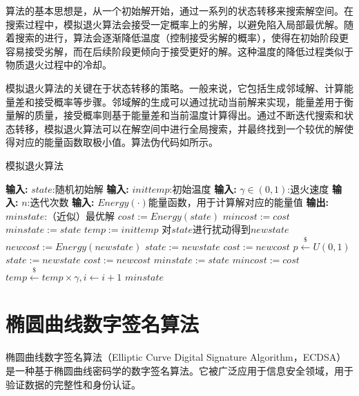 {	算法的基本思想是，从一个初始解开始，通过一系列的状态转移来搜索解空间。在搜索过程中，模拟退火算法会接受一定概率上的劣解，以避免陷入局部最优解。随着搜索的进行，算法会逐渐降低温度（控制接受劣解的概率），使得在初始阶段更容易接受劣解，而在后续阶段更倾向于接受更好的解\citep{Steinbrunn1997}。这种温度的降低过程类似于物质退火过程中的冷却。
	
	模拟退火算法的关键在于状态转移的策略。一般来说，它包括生成邻域解、计算能量差和接受概率等步骤。邻域解的生成可以通过扰动当前解来实现，能量差用于衡量解的质量，接受概率则基于能量差和当前温度计算得出。通过不断迭代搜索和状态转移，模拟退火算法可以在解空间中进行全局搜索，并最终找到一个较优的解使得对应的能量函数取极小值。算法伪代码如所示。
	
	\begin{breakablealgorithm}%
		\caption{模拟退火算法}\label{alg:sa}
		\begin{algorithmic}[1]
			\Statex \textbf{输入:} $state$:随机初始解
			\Statex \textbf{输入:} $inittemp$:初始温度
			\Statex \textbf{输入:} $\gamma\in(0,1)$:退火速度
			\Statex \textbf{输入:} $n$:迭代次数
			\Statex \textbf{输入:} $Energy(\cdot)$能量函数，用于计算解对应的能量值
			\Statex \textbf{输出:} $minstate$:（近似）最优解
			\State $cost := Energy(state)$
			\State $mincost:=cost$
			\State $minstate:=state$
			\State $temp:=inittemp$
				\Repeat
					\State 对$state$进行扰动得到$newstate$
					\State $newcost:=Energy(newstate)$
						\State $state:= newstate$
						\State $cost:= newcost$
					\Else
						\State $p\stackrel{\$}\gets U(0,1)$
							\State $state:= newstate$
							\State$cost:= newcost$
						\EndIf
					\EndIf
						\State $minstate:= state$
						\State $mincost:= cost$
					\EndIf
				\State $temp\stackrel{\$}\gets temp\times\gamma,i\gets i+1$
			\EndFor
			\State \Return $minstate$
		\end{algorithmic}
	\end{breakablealgorithm}

	\section{椭圆曲线数字签名算法}\label{sec:ecdsa}
	椭圆曲线数字签名算法（Elliptic Curve Digital Signature Algorithm，ECDSA）是一种基于椭圆曲线密码学的数字签名算法。它被广泛应用于信息安全领域，用于验证数据的完整性和身份认证。
	
}
